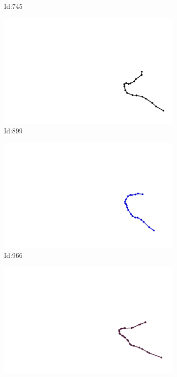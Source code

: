 \documentclass[12pt,twoside]{report}
\begin{document}
\begin{figure}
\begin{subfigure}[b]{0.20\textwidth}
\caption{Id:745}
\end{subfigure}
\begin{subfigure}[b]{0.20\textwidth}
\centering
\includegraphics[width=\textwidth]{../../trajectories/899.png}
\caption{Id:899}
\end{subfigure}
\begin{subfigure}[b]{0.20\textwidth}
\centering
\includegraphics[width=\textwidth]{../../trajectories/966.png}
\caption{Id:966}
\end{subfigure}
\begin{subfigure}[b]{0.20\textwidth}
\centering
\includegraphics[width=\textwidth]{../../trajectories/984.png}

\end{subfigure}
\end{figure}
\end{document}

